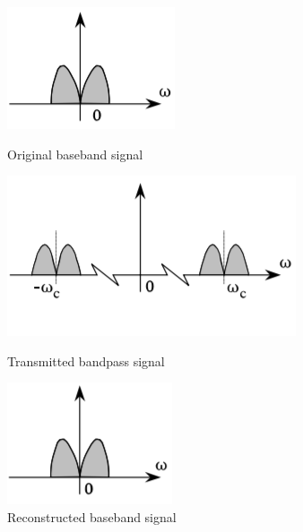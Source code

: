 \begin{figure}[!htb]
	\includegraphics[width=\linewidth]{graphics/1.png}
	\caption*{Original baseband signal}\label{fig:1}
	\endminipage\hfill
	\includegraphics[width=\linewidth]{graphics/2.png}
	\caption*{Transmitted bandpass signal}\label{fig:2}
	\endminipage\hfill
	\includegraphics[width=\linewidth]{graphics/3.png}
	\caption*{Reconstructed baseband signal}\label{fig:3}
	\endminipage
\end{figure}

